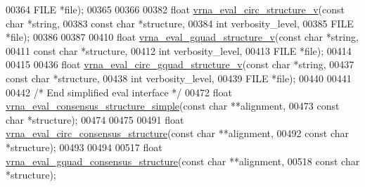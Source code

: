 \begin{DoxyCode}
00364                                    FILE       *file);
00365 
00366 
00382 \textcolor{keywordtype}{float} \mbox{\hyperlink{group__eval_gac3fb44e0773a51be8efc5f4f595a94a7}{vrna\_eval\_circ\_structure\_v}}(\textcolor{keyword}{const} \textcolor{keywordtype}{char} *\textcolor{keywordtype}{string},
00383                                  \textcolor{keyword}{const} \textcolor{keywordtype}{char} *structure,
00384                                  \textcolor{keywordtype}{int}        verbosity\_level,
00385                                  FILE       *file);
00386 
00387 
00410 \textcolor{keywordtype}{float} \mbox{\hyperlink{group__eval_gaeaa2bdbc1b5d78c667e735fbdff87fff}{vrna\_eval\_gquad\_structure\_v}}(\textcolor{keyword}{const} \textcolor{keywordtype}{char}  *\textcolor{keywordtype}{string},
00411                                   \textcolor{keyword}{const} \textcolor{keywordtype}{char}  *structure,
00412                                   \textcolor{keywordtype}{int}         verbosity\_level,
00413                                   FILE        *file);
00414 
00415 
00436 \textcolor{keywordtype}{float} \mbox{\hyperlink{group__eval_gab96a6c59923ff06c35f8c2fd2c239727}{vrna\_eval\_circ\_gquad\_structure\_v}}(\textcolor{keyword}{const} \textcolor{keywordtype}{char} *\textcolor{keywordtype}{string},
00437                                        \textcolor{keyword}{const} \textcolor{keywordtype}{char} *structure,
00438                                        \textcolor{keywordtype}{int}        verbosity\_level,
00439                                        FILE       *file);
00440 
00441 
00442 \textcolor{comment}{/* End simplified eval interface */}
00472 \textcolor{keywordtype}{float} \mbox{\hyperlink{group__eval_ga7762c3a7bdcbc3a14ef93259d322c7d6}{vrna\_eval\_consensus\_structure\_simple}}(\textcolor{keyword}{const} \textcolor{keywordtype}{char} **alignment,
00473                                            \textcolor{keyword}{const} \textcolor{keywordtype}{char} *structure);
00474 
00475 
00491 \textcolor{keywordtype}{float} \mbox{\hyperlink{group__eval_gac96577cf232c71160f762737a994b7c6}{vrna\_eval\_circ\_consensus\_structure}}(\textcolor{keyword}{const} \textcolor{keywordtype}{char} **alignment,
00492                                          \textcolor{keyword}{const} \textcolor{keywordtype}{char} *structure);
00493 
00494 
00517 \textcolor{keywordtype}{float} \mbox{\hyperlink{group__eval_gaf09a326b3d57a4b30c27bd0e216198ac}{vrna\_eval\_gquad\_consensus\_structure}}(\textcolor{keyword}{const} \textcolor{keywordtype}{char}  **alignment,
00518                                           \textcolor{keyword}{const} \textcolor{keywordtype}{char}  *structure);

\end{DoxyCode}
